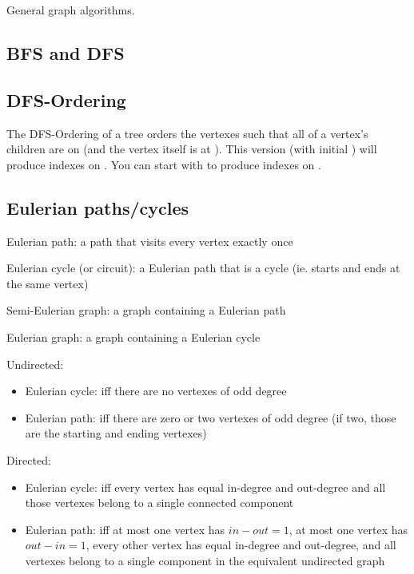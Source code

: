 
General graph algorithms.

\subsection*{BFS and DFS}

\subsection*{DFS-Ordering}

The DFS-Ordering of a tree orders the vertexes such that all of a vertex's children are on  (and the vertex itself is at ). This version (with initial ) will produce indexes on \inline{[0, numVertexes-1]}. You can start with  to produce indexes on \inline{[1, numVertexes]}.



\subsection*{Eulerian paths/cycles}

Eulerian path: a path that visits every vertex exactly once

Eulerian cycle (or circuit): a Eulerian path that is a cycle (ie. starts and ends at the same vertex)

Semi-Eulerian graph: a graph containing a Eulerian path

Eulerian graph: a graph containing a Eulerian cycle

Undirected: 
\begin{itemize}
    \item Eulerian cycle: iff there are no vertexes of odd degree
    \item Eulerian path: iff there are zero or two vertexes of odd degree (if two, those are the starting and ending vertexes)
\end{itemize}

Directed:
\begin{itemize}
    \item Eulerian cycle: iff every vertex has equal in-degree and out-degree and all those vertexes belong to a single connected component
    \item Eulerian path: iff at most one vertex has $in - out = 1$, at most one vertex has $out - in = 1$, every other vertex has equal in-degree and out-degree, and all vertexes belong to a single component in the equivalent undirected graph
\end{itemize}

